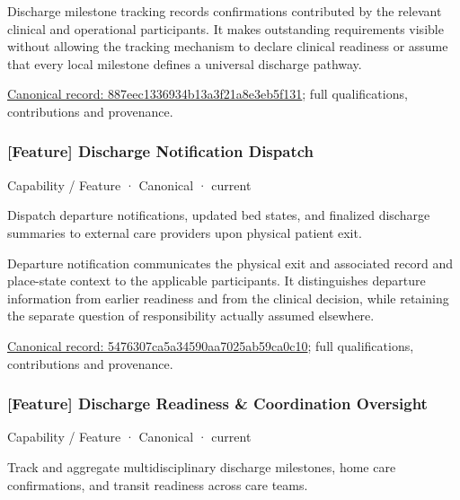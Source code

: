 Discharge milestone tracking records confirmations contributed by the relevant clinical and operational participants. It makes outstanding requirements visible without allowing the tracking mechanism to declare clinical readiness or assume that every local milestone defines a universal discharge pathway.


{\footnotesize \href{../../../../continuum/strategy/capability/feature/887eec1336934b13a3f21a8e3eb5f131.md}{Canonical record: 887eec1336934b13a3f21a8e3eb5f131}; full qualifications, contributions and provenance.}\par
\subsubsection{[Feature] Discharge Notification Dispatch}

\label{element:5476307ca5a34590aa7025ab59ca0c10}
{\small Capability / Feature · Canonical · current}\par

Dispatch departure notifications, updated bed states, and finalized discharge summaries to external care providers upon physical patient exit.



Departure notification communicates the physical exit and associated record and place-state context to the applicable participants. It distinguishes departure information from earlier readiness and from the clinical decision, while retaining the separate question of responsibility actually assumed elsewhere.


{\footnotesize \href{../../../../continuum/strategy/capability/feature/5476307ca5a34590aa7025ab59ca0c10.md}{Canonical record: 5476307ca5a34590aa7025ab59ca0c10}; full qualifications, contributions and provenance.}\par
\subsubsection{[Feature] Discharge Readiness \& Coordination Oversight}

\label{element:5499422ed3644e0bbf7645f9ae3f20cb}
{\small Capability / Feature · Canonical · current}\par

Track and aggregate multidisciplinary discharge milestones, home care confirmations, and transit readiness across care teams.



